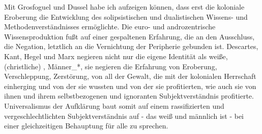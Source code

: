 Mit Grosfoguel und Dussel habe ich aufzeigen können, dass erst die koloniale
Eroberung die Entwicklung des solipsistischen und dualistischen Wissens- und
Methodenverständnisses ermöglichte. Die euro- und androzentrische
Wissensproduktion fußt auf einer gespaltenen Erfahrung, die an den Ausschluss,
die Negation, letztlich an die Vernichtung der Peripherie gebunden ist.
Descartes, Kant, Hegel und Marx negieren nicht nur die eigene Identität als
weiße, (christliche) \footnotemark {} , Männer\_*, sie
negieren die Erfahrung von Eroberung, Verschleppung, Zerstörung, von all der
Gewalt, die mit der kolonialen Herrschaft einherging und von der sie wussten
und von der sie profitierten, wie auch sie von ihnen und ihrem selbstbezogenen
und ignoranten Subjektverständnis profitierte. Universalismus der Aufklärung
baut somit auf einem rassifizierten und vergeschlechtlichten Subjektverständnis
auf - das weiß und männlich ist - bei einer gleichzeitigen Behauptung für alle
zu sprechen.

